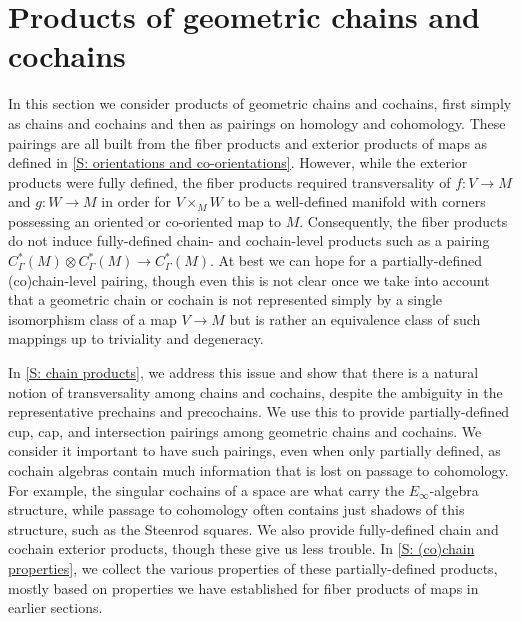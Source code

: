 
\section{Products of geometric chains and cochains}\label{S: products}

In this section we consider products of geometric chains and cochains, first simply as chains and cochains and then as pairings on homology and cohomology.
These pairings are all built from the fiber products and exterior products of maps as defined in \cref{S: orientations and co-orientations}.
However, while the exterior products were fully defined, the fiber products required transversality of $f \colon V \to M$ and $g \colon W \to M$ in order for $V \times_M W$ to be a well-defined manifold with corners possessing an oriented or co-oriented map to $M$.
Consequently, the fiber products do not induce fully-defined chain- and cochain-level products such as a pairing $C^*_\Gamma(M) \otimes C^*_\Gamma(M) \to C^*_\Gamma(M)$.
At best we can hope for a partially-defined (co)chain-level pairing, though even this is not clear once we take into account that a geometric chain or cochain is not represented simply by a single isomorphism class of a map $V \to M$ but is rather an equivalence class of such mappings up to triviality and degeneracy.

In \cref{S: chain products}, we address this issue and show that there is a natural notion of transversality among chains and cochains, despite the ambiguity in the representative prechains and precochains.
We use this to provide partially-defined cup, cap, and intersection pairings among geometric chains and cochains.
We consider it important to have such pairings, even when only partially defined, as cochain algebras contain much information that is lost on passage to cohomology.
For example, the singular cochains of a space are what carry the $E_\infty$-algebra structure, while passage to cohomology often contains just shadows of this structure, such as the Steenrod squares.
We also provide fully-defined chain and cochain exterior products, though these give us less trouble.
In \cref{S: (co)chain properties}, we collect the various properties of these partially-defined products, mostly based on properties we have established for fiber products of maps in earlier sections.

